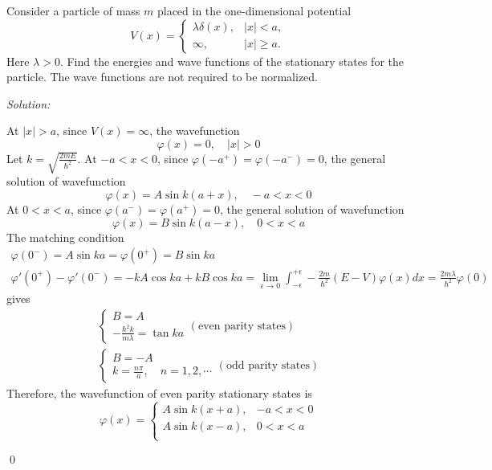 \documentclass[12pt,a4paper]{article}
\newenvironment{problem}[2][Problem]{\begin{trivlist}
\item[\hskip \labelsep {\bfseries #1}\hskip \labelsep {\bfseries #2.}]}{\end{trivlist}}
\newenvironment{sol}
    {\emph{Solution:}
    }
    {
    \qed
    }
\begin{document}
\begin{problem}{2}
Consider a particle of mass $m$ placed in the one-dimensional potential
\[
V(x)=
\left\{\begin{array}{ll}
\lambda\delta(x),&|x|<a,\\
\infty,&|x|\geq a.
\end{array}\right.
\]
Here $\lambda>0$. Find the energies and wave functions of the stationary states for the particle. The wave functions are not required to be normalized.
\end{problem}
\begin{sol}
At $|x|>a$, since $V(x)=\infty$, the wavefunction
\begin{equation}
\varphi(x)=0,\quad|x|>0
\end{equation}
Let $k=\sqrt{\frac{2mE}{\hbar^2}}$. At $-a<x<0$, since $\varphi(-a^+)=\varphi(-a^-)=0$, the general solution of wavefunction
\begin{equation}
\varphi(x)=A\sin k(a+x),\quad-a<x<0
\end{equation}
At $0<x<a$, since $\varphi(a^-)=\varphi(a^+)=0$, the general solution of wavefunction
\begin{equation}
\varphi(x)=B\sin k(a-x),\quad0<x<a
\end{equation}
The matching condition
\small\begin{gather}
\varphi(0^-)=A\sin ka=\varphi(0^+)=B\sin ka\\
\varphi'(0^+)-\varphi'(0^-)=-kA\cos ka+kB\cos ka=\lim_{\epsilon\rightarrow0}\int_{-\epsilon}^{+\epsilon}-\frac{2m}{\hbar^2}(E-V)\varphi(x)dx=\frac{2m\lambda}{\hbar^2}\varphi(0)
\end{gather}\normalsize
gives
\begin{gather}
\left\{\begin{array}{l}
B=A\\
-\frac{\hbar^2k}{m\lambda}=\tan ka
\end{array}\right.(\text{even parity states})\\
\left\{\begin{array}{l}
B=-A\\
k=\frac{n\pi}{a},\quad n=1,2,\cdots
\end{array}\right.(\text{odd parity states})
\end{gather}
Therefore, the wavefunction of even parity stationary states is
\begin{equation}
\varphi(x)=\left\{\begin{array}{ll}
A\sin k(x+a),&-a<x<0\\
A\sin k(x-a),&0<x<a\\

\end{array}
\end{equation}
\end{sol}
\end{document}
